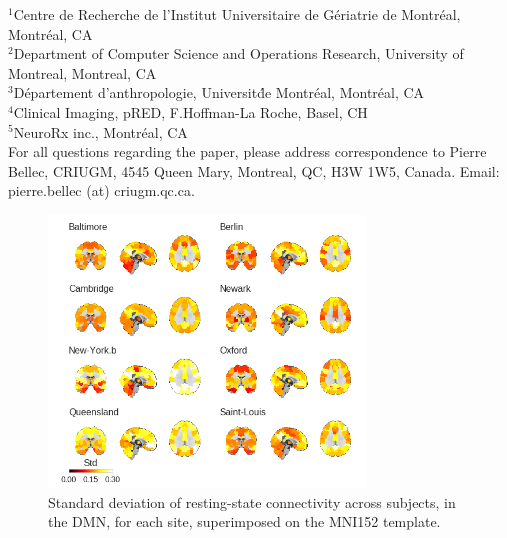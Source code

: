 \documentclass[authoryear]{elsarticle}
\begin{document}
$^1$Centre de Recherche de l'Institut Universitaire de G\'eriatrie de Montr\'eal, Montr\'eal, CA\\
$^2$Department of Computer Science and Operations Research, University of Montreal, Montreal, CA\\
$^3$D\'epartement d'anthropologie, Universit\' de Montr\'eal, Montr\'eal, CA\\
$^4$Clinical Imaging, pRED, F.Hoffman-La Roche, Basel, CH\\
$^5$NeuroRx inc., Montr\'eal, CA\\

For all questions regarding the paper, please address correspondence to Pierre Bellec, CRIUGM, 4545 Queen Mary, Montreal, QC, H3W 1W5, Canada. Email: pierre.bellec (at) criugm.qc.ca.\\


\begin{figure}[htbp]
\centering
\includegraphics[width=0.75\textwidth]{../figures/dmn_stdmultisite.png}
\caption[]{
Standard deviation of resting-state connectivity across subjects, in the DMN, for each site, superimposed on the MNI152 template.
}
\label{fig_std_DMNs}
\end{figure}
\end{document}
